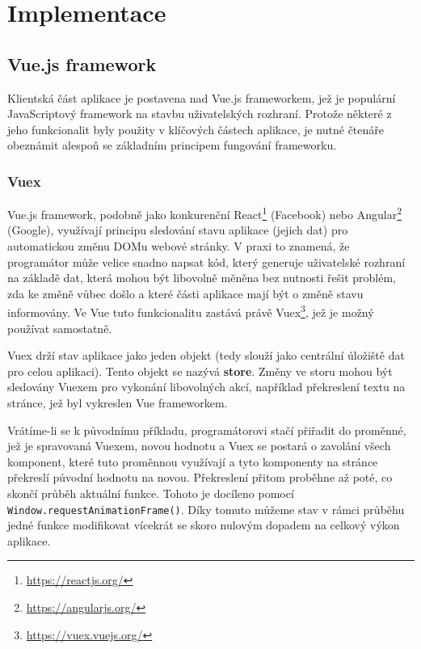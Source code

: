 \chapter{Implementace}

\section{Vue.js framework}
Klientská část aplikace je postavena nad Vue.js frameworkem, jež je populární JavaScriptový framework na stavbu uživatelských rozhraní. Protože některé z jeho funkcionalit byly použity v klíčových částech aplikace, je nutné čtenáře obeznámit alespoň se základním principem fungování frameworku.

\subsection{Vuex}
Vue.js framework, podobně jako konkurenční React\footnote{\url{https://reactjs.org/}} (Facebook) nebo Angular\footnote{\url{https://angularjs.org/}} (Google), využívají principu sledování stavu aplikace (jejich dat) pro automatickou změnu DOMu webové stránky. V praxi to znamená, že programátor může velice snadno napsat kód, který generuje uživatelské rozhraní na základě dat, která mohou být libovolně měněna bez nutnosti řešit problém, zda ke změně vůbec došlo a které části aplikace mají být o změně stavu informovány. Ve Vue tuto funkcionalitu zastává právě Vuex\footnote{\url{https://vuex.vuejs.org/}}, jež je možný používat samostatně.

Vuex drží stav aplikace jako jeden objekt (tedy slouží jako centrální úložiště dat pro celou aplikaci). Tento objekt se nazývá \textbf{store}. Změny ve storu mohou být sledovány Vuexem pro vykonání libovolných akcí, například překreslení textu na stránce, jež byl vykreslen Vue frameworkem.

\newcommand{\inlinecode}{\texttt}

Vrátíme-li se k původnímu příkladu, programátorovi stačí přiřadit do proměnné, jež je spravovaná Vuexem, novou hodnotu a Vuex se postará o zavolání všech komponent, které tuto proměnnou využívají a tyto komponenty na stránce překreslí původní hodnotu na novou. Překreslení přitom proběhne až poté, co skončí průběh aktuální funkce. Tohoto je docíleno pomocí \\  \texttt{Window.requestAnimationFrame()}. Díky tomuto můžeme stav v rámci průběhu jedné funkce modifikovat vícekrát se skoro nulovým dopadem na celkový výkon aplikace.


